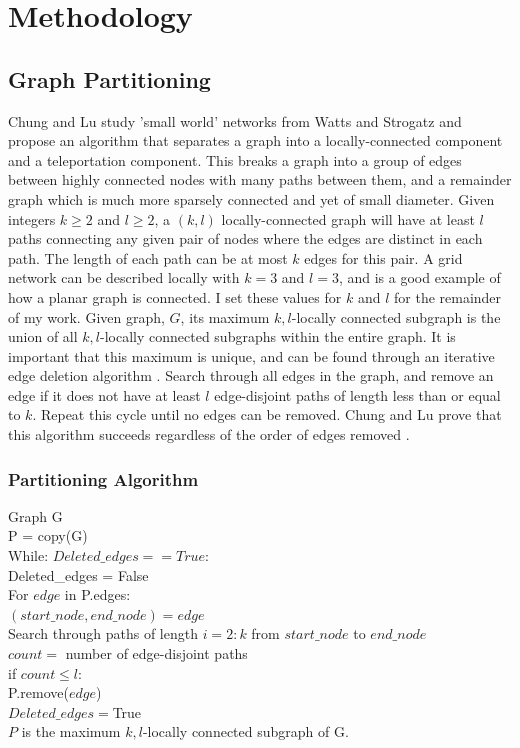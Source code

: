 \documentclass{article}
\begin{document}
\section{Methodology}
\subsection{Graph Partitioning}
Chung and Lu study 'small world' networks from Watts and Strogatz \cite{Watts:1998} and propose an algorithm that separates a graph into a locally-connected component and a teleportation component. This breaks a graph into a group of edges between highly connected nodes with many paths between them, and a remainder graph which is much more sparsely
connected and yet of small diameter. Given integers $k \geq 2$ and $l \geq 2$, a $(k,l)$ locally-connected graph will have at least $l$ paths connecting any given pair of nodes where the edges are distinct in each path. The length of each path can be at most $k$ edges for this pair. A grid network can be described locally with $k=3$ and $l=3$, and is a good example of how a planar graph is connected. I set these values for $k$ and $l$ for the remainder of my work. Given graph, $G$, its maximum $k,l$-locally connected subgraph is the union of all $k,l$-locally connected subgraphs within the entire graph. It is important that this maximum is unique, and can be found through an iterative edge deletion algorithm \cite{Chung:2004}. Search through all edges in the graph, and remove an edge if it does not have at least $l$ edge-disjoint paths of length less than or equal to $k$. Repeat this cycle until no edges can be removed. Chung and Lu prove that this algorithm succeeds regardless of the order of edges removed \cite{Chung:2004}.

\subsubsection{Partitioning Algorithm}
\begin{spacing}{1}
Graph G\\
P = copy(G)\\
While: $Deleted\_edges == True$:\\
\indent Deleted\_edges = False\\
\indent For $edge$ in P.edges:\\
\indent \indent $(start\_node, end\_node) = edge$\\
\indent \indent Search through paths of length $i=2:k$ from $start\_node$ to $end\_node$\\
\indent \indent $count =$  number of edge-disjoint paths\\
\indent \indent if $count \leq l$:\\
\indent \indent \indent P.remove($edge$)\\
\indent \indent \indent $Deleted\_edges = $True\\
$P$ is the maximum $k,l$-locally connected subgraph of G.
\end{spacing}	
\end{document}
